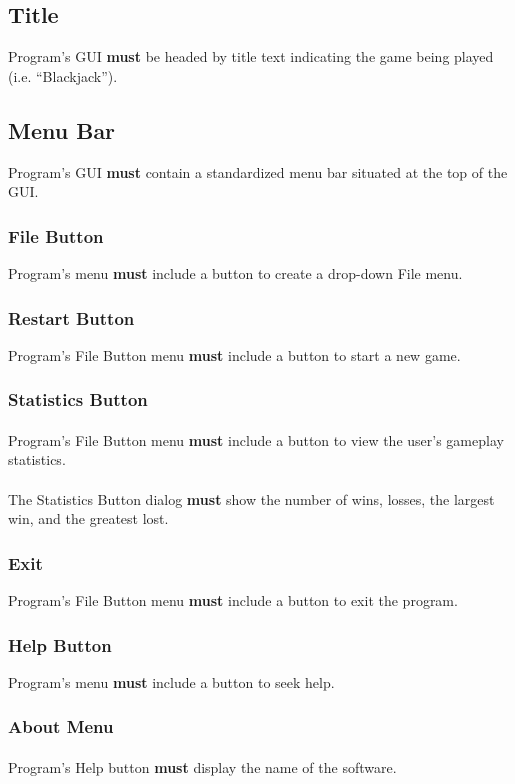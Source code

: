 \documentclass{article}
\begin{document}
\subsection{Title}Program’s GUI \textbf{must} be headed by title text indicating the game being played (i.e. “Blackjack”).
\subsection{Menu Bar}Program’s GUI \textbf{must} contain a standardized menu bar situated at the top of the GUI.  
\subsubsection{File Button}Program’s menu \textbf{must} include a button to create a drop-down File menu.
\subsubsection{Restart Button}Program’s File Button menu \textbf{must} include a button to start a new game.
\subsubsection{Statistics Button}
\paragraph{}Program’s File Button menu \textbf{must} include a button to view the user’s gameplay statistics.
\paragraph{}The Statistics Button dialog \textbf{must} show the number of wins, losses, the largest win, and the greatest lost.
\subsubsection{Exit}Program’s File Button menu \textbf{must} include a button to exit the program.
\subsubsection{Help Button}Program’s menu \textbf{must} include a button to seek help.
\subsubsection{About Menu}
\paragraph{}Program’s Help button \textbf{must} display the name of the software.
\end{document}
